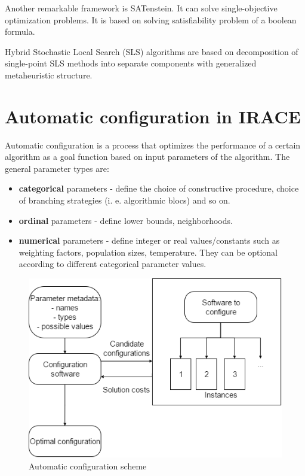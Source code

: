 \documentclass[12pt]{article}
\begin{document}
Another remarkable framework is SATenstein. It can solve single-objective optimization problems. It is based on solving satisfiability problem of a boolean formula.

Hybrid Stochastic Local Search (SLS) algorithms are based on decomposition of single-point SLS methods into separate components with generalized metaheuristic structure.


\section{Automatic configuration in IRACE}

Automatic configuration is a process that optimizes the performance of a certain algorithm as a goal function based on input parameters of the algorithm. The general parameter types are:
 
\begin{itemize}
\item \textbf{categorical} parameters - define the choice of constructive procedure, choice of branching strategies (i. e. algorithmic blocs) and so on.
\item \textbf{ordinal} parameters - define lower bounds, neighborhoods.
\item \textbf{numerical} parameters - define integer or real values/constants such as weighting factors, population sizes, temperature. They can be optional according to different categorical parameter values.
\end{itemize}

\begin{figure}[H]
  \centering
    \includegraphics[scale=0.7]{configuration-top-level.png}
  \caption{Automatic configuration scheme}
  \label{fig:autoconf}
\end{figure}
\end{document}
